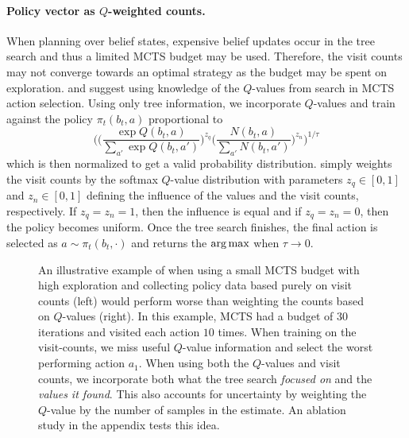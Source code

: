 \paragraph{Policy vector as $Q$-weighted counts.}
When planning over belief states, expensive belief updates occur in the tree search and thus a limited MCTS budget may be used.
Therefore, the visit counts may not converge towards an optimal strategy as the budget may be spent on exploration.
\citeauthor{danihelka2022policy} and \citeauthor{czech2021improving} suggest using knowledge of the $Q$-values from search in MCTS action selection.
Using only tree information, we incorporate $Q$-values and train against the policy $\pi_t(b_t, a)$ proportional to
\begin{equation}
    \Biggl(\biggl(\frac{\exp Q(b_t, a)}{\sum_{a'} \exp Q(b_t, a')}\biggr)^{z_q}\biggl(\frac{N(b_t,a)}{\sum_{a'} N(b_t,a')}\biggr)^{z_n}\Biggr)^{1/\tau}\label{eq:policy_q_weight}
\end{equation}
which is then normalized to get a valid probability distribution.
 simply weights the visit counts by the softmax $Q$-value distribution with parameters $z_q \in [0,1]$ and $z_n \in [0,1]$ defining the influence of the values and the visit counts, respectively.
If $z_q=z_n=1$, then the influence is equal and if $z_q=z_n=0$, then the policy becomes uniform.
Once the tree search finishes, the final action is selected as $a \sim \pi_t(b_t, \cdot)$ and returns the $\operatorname*{arg\,max}$ when $\tau \to 0$.

\begin{figure}[h!]
    \centering
    \resizebox{\linewidth}{!}{
        
    }
    \caption{An illustrative example of when using a small MCTS budget with high exploration and collecting policy data based purely on visit counts (left) would perform worse than weighting the counts based on $Q$-values (right).
    In this example, MCTS had a budget of $30$ iterations and visited each action $10$ times.
    When training on the visit-counts, we miss useful $Q$-value information and select the worst performing action $a_1$.
    When using both the $Q$-values and visit counts, we incorporate both what the tree search \textit{focused on} and the \textit{values it found}.
    This also accounts for uncertainty by weighting the $Q$-value by the number of samples in the estimate.
    An ablation study in the appendix tests this idea.}
    \label{fig:q-weighting}
\end{figure}


